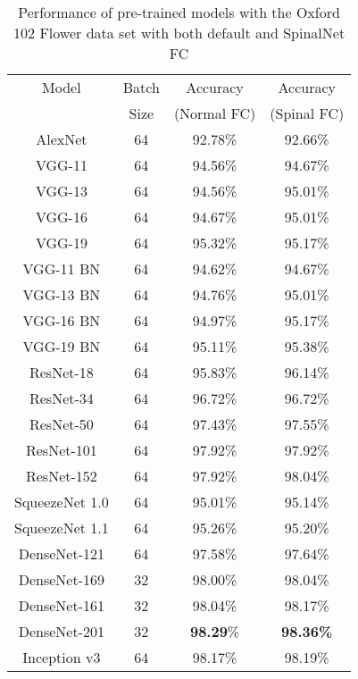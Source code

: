 \documentclass[conference]{IEEEtran}
\begin{document}
\begin{table}
		\caption{Performance of pre-trained models with the Oxford 102 Flower data set with both default and SpinalNet FC}
		\label{Flowers_Results} \centering
\begin{tabular}{|c|c|c|c|}	\hline 

    Model & Batch   & Accuracy    & Accuracy    \\ 
          & Size     & (Normal FC) & (Spinal FC) \\
    
    \hline AlexNet & 64    &  92.78\%   & 92.66\% \\
    \hline VGG-11  & 64    &   94.56\%    & 94.67\%   \\ 
    \hline VGG-13  & 64    &   94.56\%    & 95.01\%   \\
    \hline VGG-16  & 64    &   94.67\%    & 95.01\%   \\
    \hline VGG-19  & 64   &   95.32\%    & 95.17\%   \\
    \hline VGG-11 BN    & 64 &  94.62\%    & 94.67\%   \\
    \hline VGG-13 BN    & 64  &  94.76\%    & 95.01\%   \\
    \hline VGG-16 BN    & 64  &  94.97\%    & 95.17\%   \\
    \hline VGG-19 BN    & 64  &  95.11\%    & 95.38\%   \\
    \hline ResNet-18    & 64  &  95.83\%    & 96.14\%   \\
    \hline ResNet-34    & 64 &  96.72\%    & 96.72\%   \\
    \hline ResNet-50    & 64 &  97.43\%    & 97.55\%   \\
    \hline ResNet-101   & 64 &  97.92\%    & 97.92\%   \\
    \hline ResNet-152   & 64 &  97.92\%    & 98.04\%   \\
    \hline SqueezeNet 1.0 & 64 & 95.01\%    & 95.14\%   \\
    \hline SqueezeNet 1.1 & 64 & 95.26\%    & 95.20\%   \\ 
    \hline DenseNet-121 & 64 &  97.58\%    & 97.64\%   \\
    \hline DenseNet-169 & 32 &  98.00\%    & 98.04\%   \\
    \hline DenseNet-161 & 32 &  98.04\%    & 98.17\%   \\
    \hline DenseNet-201 & 32 &  \textbf{98.29}\%    & \textbf{98.36\%}   \\
    \hline Inception v3 & 64 &  98.17\%    & 98.19\%   \\

\end{tabular}
\end{table}
\end{document}
